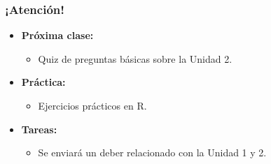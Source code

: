 \documentclass[aspectratio=169]{beamer}
\begin{document}
\begin{frame}
\frametitle{¡Atención!}
\begin{itemize}
    \item \textbf{Próxima clase:}
    \begin{itemize}
        \item Quiz de preguntas básicas sobre la Unidad 2.
    \end{itemize}
    \item \textbf{Práctica:}
    \begin{itemize}
        \item Ejercicios prácticos en R.
    \end{itemize}
    \item \textbf{Tareas:}
    \begin{itemize}
        \item Se enviará un deber relacionado con la Unidad 1 y 2.
    \end{itemize}
\end{itemize}
\end{frame}
\end{document}
